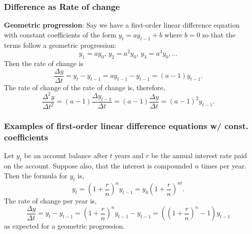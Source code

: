 \documentclass[MathsNotesBase.tex]{subfiles}
\begin{document}
{		\biggerskip
		\subsubsection{Difference as Rate of change}
		\biggerskip
		\textbf{Geometric progression}: Say we have a first-order linear difference equation with constant coefficients of the form ${ y_t = ay_{t-1} + b }$ where ${ b = 0 }$ so that the terms follow a geometric progression:
		\[ y_1 = ay_0,\, y_2 = a^2y_0,\, y_3 = a^3y_0, \dots \]
		Then the rate of change is
		\[ \frac{\Delta y}{\Delta t} = y_t - y_{t-1} = ay_{t-1} - y_{t-1} = (a - 1)y_{t-1}. \]
		The rate of change of the rate of change is, therefore,
		\[ \frac{\Delta^2 y}{\Delta t^2} = (a - 1)\frac{\Delta y_{t-1}}{\Delta t} = (a - 1)\frac{\Delta y}{\Delta t} = (a - 1)^2 y_{t-1}. \]
	
		\bigskip
		\subsubsection{Examples of first-order linear difference equations w/ const. coefficients}
		\begin{exe}
			\item{Let $y_t$ be an account balance after $t$ years and $r$ be the annual interest rate paid on the account. Suppose also, that the interest is compounded $n$ times per year. Then the formula for $y_t$ is,
				\[ y_t = \left(1 + \frac{r}{n}\right)^n y_{t-1} = y_0 \left(1 + \frac{r}{n}\right)^{nt}. \]
				The rate of change per year is,
				\[ \frac{\Delta y}{\Delta t} = y_t - y_{t-1} = \left(1 + \frac{r}{n}\right)^n y_{t-1} - y_{t-1} = \left(\left(1 + \frac{r}{n}\right)^n - 1\right) y_{t-1} \]
				as expected for a geometric progression.\\
				
}
\end{exe}}
\end{document}
